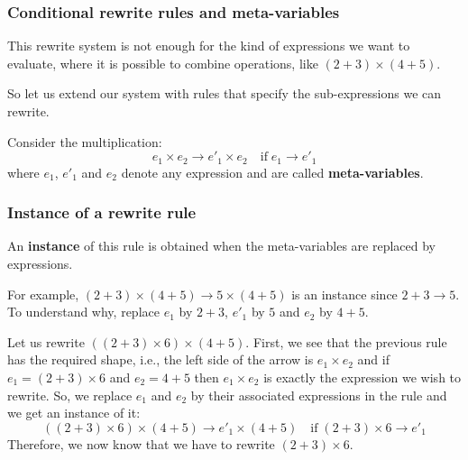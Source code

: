 %
\begin{frame}
\frametitle{Conditional rewrite rules and meta-variables}

This rewrite system is not enough for the kind of expressions we want
to evaluate, where it is possible to combine operations, like \((2+3)
\times (4+5)\).

\bigskip

So let us extend our system with rules that specify the
sub-expressions we can rewrite. 

\bigskip

Consider the multiplication:
\[
e_1 \times e_2 \rightarrow e'_1 \times e_2 \quad \text{if} \; e_1
\rightarrow e'_1
\]
where \(e_1\), \(e'_1\) and \(e_2\) denote any expression and are
called \textbf{meta-variables}.

\end{frame}

%
\begin{frame}
\frametitle{Instance of a rewrite rule}

An \textbf{instance} of this rule is obtained when the meta-variables
are replaced by expressions.

\bigskip

For example, \( (2+3) \times (4+5) \rightarrow 5 \times (4+5) \) is an
instance since \(2 + 3 \rightarrow 5\). To understand why, replace
\(e_1\) by \(2+3\), \(e'_1\) by \(5\) and \(e_2\) by \(4+5\). 

\bigskip

Let us rewrite \(((2 + 3) \times 6) \times (4+5)\). First, we see that
the previous rule has the required shape, i.e., the left side of the
arrow is \(e_1 \times e_2\) and if \(e_1 = (2+3) \times 6\) and \(e_2
= 4+5\) then \(e_1 \times e_2\) is exactly the expression we wish to
rewrite. So, we replace \(e_1\) and \(e_2\) by their associated
expressions in the rule and we get an instance of it:
\[
((2 + 3) \times 6) \times (4+5) \rightarrow e'_1 \times (4+5) \quad
\text{if} \; (2+3) \times 6 \rightarrow e'_1
\]
Therefore, we now know that we have to rewrite \((2 + 3) \times 6\).

\end{frame}


